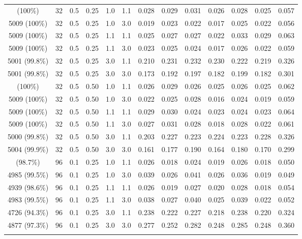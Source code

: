 \begin{longtable}[t]{ccccccrrrrrrc}
\addlinespace
5008 (100\%) & 32 & 0.5 & 0.25 & 1.0 & 1.1 & 0.028 & 0.029 & 0.031 & 0.026 & 0.028 & 0.025 & 0.057\\
5009 (100\%) & 32 & 0.5 & 0.25 & 1.0 & 3.0 & 0.019 & 0.023 & 0.022 & 0.017 & 0.025 & 0.022 & 0.056\\
5009 (100\%) & 32 & 0.5 & 0.25 & 1.1 & 1.1 & 0.025 & 0.027 & 0.027 & 0.022 & 0.033 & 0.029 & 0.063\\
5009 (100\%) & 32 & 0.5 & 0.25 & 1.1 & 3.0 & 0.023 & 0.025 & 0.024 & 0.017 & 0.026 & 0.022 & 0.059\\
5001 (99.8\%) & 32 & 0.5 & 0.25 & 3.0 & 1.1 & 0.210 & 0.231 & 0.232 & 0.230 & 0.222 & 0.219 & 0.326\\
5001 (99.8\%) & 32 & 0.5 & 0.25 & 3.0 & 3.0 & 0.173 & 0.192 & 0.197 & 0.182 & 0.199 & 0.182 & 0.301\\
\addlinespace
5008 (100\%) & 32 & 0.5 & 0.50 & 1.0 & 1.1 & 0.026 & 0.029 & 0.026 & 0.025 & 0.026 & 0.025 & 0.062\\
5009 (100\%) & 32 & 0.5 & 0.50 & 1.0 & 3.0 & 0.022 & 0.025 & 0.028 & 0.016 & 0.024 & 0.019 & 0.059\\
5009 (100\%) & 32 & 0.5 & 0.50 & 1.1 & 1.1 & 0.029 & 0.030 & 0.024 & 0.023 & 0.024 & 0.023 & 0.064\\
5009 (100\%) & 32 & 0.5 & 0.50 & 1.1 & 3.0 & 0.027 & 0.031 & 0.028 & 0.018 & 0.028 & 0.022 & 0.061\\
5000 (99.8\%) & 32 & 0.5 & 0.50 & 3.0 & 1.1 & 0.203 & 0.227 & 0.223 & 0.224 & 0.223 & 0.228 & 0.326\\
5004 (99.9\%) & 32 & 0.5 & 0.50 & 3.0 & 3.0 & 0.161 & 0.177 & 0.190 & 0.164 & 0.180 & 0.170 & 0.299\\
\addlinespace
4944 (98.7\%) & 96 & 0.1 & 0.25 & 1.0 & 1.1 & 0.026 & 0.018 & 0.024 & 0.019 & 0.026 & 0.018 & 0.050\\
4985 (99.5\%) & 96 & 0.1 & 0.25 & 1.0 & 3.0 & 0.039 & 0.026 & 0.041 & 0.026 & 0.036 & 0.019 & 0.049\\
4939 (98.6\%) & 96 & 0.1 & 0.25 & 1.1 & 1.1 & 0.026 & 0.019 & 0.027 & 0.020 & 0.028 & 0.018 & 0.054\\
4983 (99.5\%) & 96 & 0.1 & 0.25 & 1.1 & 3.0 & 0.038 & 0.027 & 0.040 & 0.025 & 0.039 & 0.022 & 0.052\\
4726 (94.3\%) & 96 & 0.1 & 0.25 & 3.0 & 1.1 & 0.238 & 0.222 & 0.227 & 0.218 & 0.238 & 0.220 & 0.324\\
4877 (97.3\%) & 96 & 0.1 & 0.25 & 3.0 & 3.0 & 0.277 & 0.252 & 0.282 & 0.248 & 0.285 & 0.248 & 0.360\\
\addlinespace

\end{longtable}
